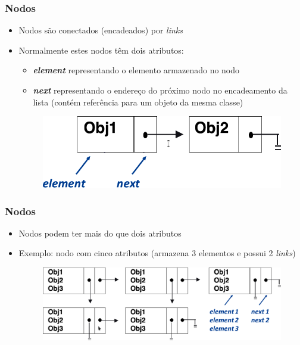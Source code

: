 \documentclass[aspectratio=169]{beamer}
\begin{document}
\begin{frame}\frametitle{Nodos}
\begin{itemize}
	\item Nodos são conectados (encadeados) por \emph{links}
	\item Normalmente estes nodos têm dois atributos:
	\begin{itemize}
		\item \textbf{\emph{element}} representando o elemento armazenado no nodo
		\item \textbf{\emph{next}} representando o endereço do próximo nodo no encadeamento da lista (contém referência para um objeto da mesma classe)
	\end{itemize}
\begin{figure}[h]
	\includegraphics[height=0.2\paperheight]{pucrs-ec-poo-unidade_12-estruturas_encadeadas-laminas-estrutura_encadeada_05.png}
\end{figure}
\end{itemize}
\end{frame}

\begin{frame}\frametitle{Nodos}
\begin{itemize}
	\item Nodos podem ter mais do que dois atributos
	\item Exemplo: nodo com cinco atributos (armazena 3 elementos e possui 2 \emph{links})
\begin{figure}[h]
	\includegraphics[height=0.3\paperheight]{pucrs-ec-poo-unidade_12-estruturas_encadeadas-laminas-estrutura_encadeada_06.png}
\end{figure}
\end{itemize}
\end{frame}
\end{document}
